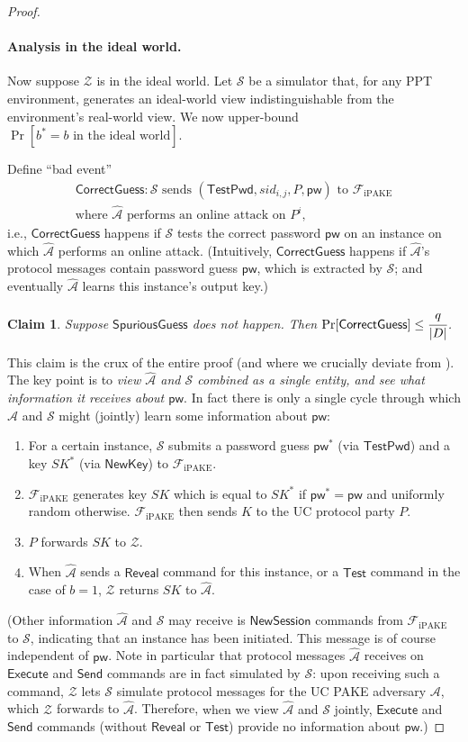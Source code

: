 \documentclass{article}
\newtheorem{claim}{Claim}
\newcommand{\adv}{\mathcal{A}}
\newcommand{\env}{\mathcal{Z}}
\renewcommand{\sim}{\mathcal{S}}
\newcommand{\func}{\mathcal{F}}
\newcommand{\Fipake}{\func_\mathrm{iPAKE}}
\newcommand{\pw}{\mathsf{pw}}
\newcommand{\NewSession}{\mathsf{NewSession}}
\newcommand{\TestPwd}{\mathsf{TestPwd}}
\newcommand{\NewKey}{\mathsf{NewKey}}
\newcommand{\Execute}{\mathsf{Execute}}
\newcommand{\Send}{\mathsf{Send}}
\newcommand{\Reveal}{\mathsf{Reveal}}
\newcommand{\Test}{\mathsf{Test}}
\newcommand{\SpuriousGuess}{\mathsf{SpuriousGuess}}
\newcommand{\CorrectGuess}{\mathsf{CorrectGuess}}
\begin{document}
\begin{proof}
\paragraph{Analysis in the ideal world.}
Now suppose $\env$ is in the ideal world. Let $\sim$ be a simulator that, for any PPT environment, generates an ideal-world view indistinguishable from the environment's real-world view. We now upper-bound $\Pr[b^* = b\text{ in the ideal world}]$.

Define ``bad event''
\begin{align*}
\CorrectGuess : \sim\text{ sends }(\TestPwd, sid_{i,j}, P, \pw)\text{ to }\Fipake \\
\text{where }\widehat{\adv}\text{ performs an online attack on }P^i,
\end{align*}
i.e., $\CorrectGuess$ happens if $\sim$ tests the correct password $\pw$ on an instance on which $\widehat{\adv}$ performs an online attack. (Intuitively, $\CorrectGuess$ happens if $\widehat{\adv}$'s protocol messages contain password guess $\pw$, which is extracted by $\sim$; and eventually $\widehat{\adv}$ learns this instance's output key.)
\begin{claim}
\label{clm:tested}
Suppose $\SpuriousGuess$ does not happen. Then $\Pr[\CorrectGuess] \leq \cfrac{q}{|D|}$.
\end{claim}
This claim is the crux of the entire proof (and where we crucially deviate from \cite{EC:CHKLM05}). The key point is to \emph{view $\widehat{\adv}$ and $\sim$ combined as a single entity, and see what information it receives about $\pw$}. In fact there is only a single cycle through which $\widehat{\adv}$ and $\sim$ might (jointly) learn some information about $\pw$:
\begin{enumerate}
  \item For a certain instance, $\sim$ submits a password guess $\pw^*$ (via $\TestPwd$) and a key $SK^*$ (via $\NewKey$) to $\Fipake$.
  \item $\Fipake$ generates key $SK$ which is equal to $SK^*$ if $\pw^* = \pw$ and uniformly random otherwise. $\Fipake$ then sends $K$ to the UC protocol party $P$.
  \item $P$ forwards $SK$ to $\env$.
  \item When $\widehat{\adv}$ sends a $\Reveal$ command for this instance, or a $\Test$ command in the case of $b = 1$, $\env$ returns $SK$ to $\widehat{\adv}$.
\end{enumerate}
(Other information $\widehat{\adv}$ and $\sim$ may receive is $\NewSession$ commands from $\Fipake$ to $\sim$, indicating that an instance has been initiated. This message is of course independent of $\pw$. Note in particular that protocol messages $\widehat{\adv}$ receives on $\Execute$ and $\Send$ commands are in fact simulated by $\sim$: upon receiving such a command, $\env$ lets $\sim$ simulate protocol messages for the UC PAKE adversary $\adv$, which $\env$ forwards to $\widehat{\adv}$. Therefore, {\color{blue}when we view $\widehat{\adv}$ and $\sim$ jointly, $\Execute$ and $\Send$ commands (without $\Reveal$ or $\Test$) provide no information about $\pw$}.)


\end{proof}
\end{document}
